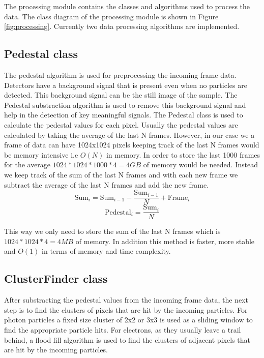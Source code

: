 \begin{spacing}{1.2}
    The processing module contains the classes and algorithms used to process the data.
    The class diagram of the processing module is shown in Figure \ref{fig:processing}.
    Currently two data processing algorithms are implemented.

    \subsection{Pedestal class}

    The pedestal algorithm is used for preprocessing the incoming frame data. Detectors have a
    background signal that is present even when no particles are detected. This background signal
    can be the still image of the sample. The Pedestal substraction algorithm is used to remove
    this background signal and help in the detection of key meaningful signals. The Pedestal class
    is used to calculate the pedestal values for each pixel. Usually the pedestal values are
    calculated by taking the average of the last N frames. However, in our case we a frame of data
    can have 1024x1024 pixels keeping track of the last N frames would be memory intensive i.e
    $O(N)$ in memory.
    In order to store the last 1000 frames for the average $1024*1024*1000*4 = 4GB$  of memory would be needed.
    Instead we keep track of the sum of the last N frames and with each new frame we subtract the
    average of the last N frames and add the new frame.
    \begin{equation}
        \text{Sum}_i = \text{Sum}_{i-1} - \frac{\text{Sum}_{i-1}}{N} + \text{Frame}_i
    \end{equation}
    \begin{equation}
        \text{Pedestal}_i = \frac{\text{Sum}_i}{N}
    \end{equation}

    This way we only need to store the sum of the last N frames
    which is $1024*1024*4 = 4MB$ of memory.  In addition this method is faster, more stable
    and $O(1)$ in terms of memory and time complexity.


    \subsection{ClusterFinder class}
    After substracting the pedestal values from the incoming frame data, the next step is to
    find the clusters of pixels that are hit by the incoming particles. For photon particles
    a fixed size cluster of 2x2 or 3x3 is used as a sliding window to find the appropriate   particle hits.
    For electrons, as they usually leave a trail behind, a flood fill algorithm is used to find the
    clusters of adjacent pixels that are hit by the incoming particles.\\



\end{spacing}
